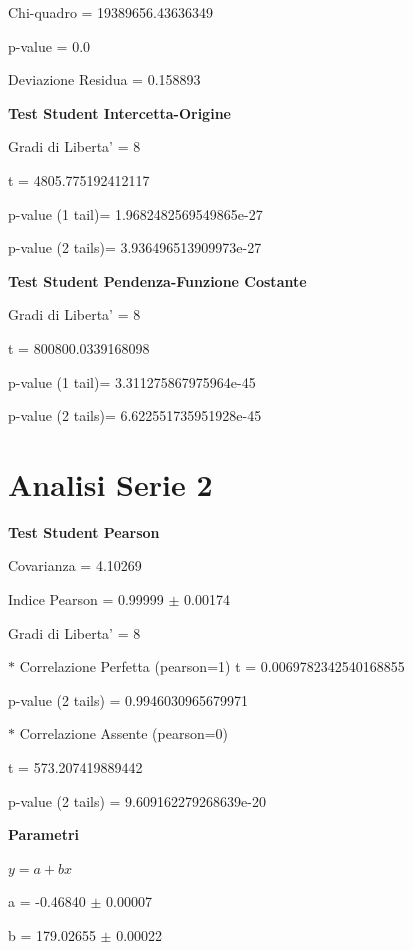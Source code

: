 \documentclass{article}
\begin{document}
Chi-quadro = 19389656.43636349

p-value = 0.0

Deviazione Residua = 0.158893

\textbf{Test Student Intercetta-Origine}

Gradi di Liberta' = 8

t = 4805.775192412117

p-value (1 tail)= 1.9682482569549865e-27

p-value (2 tails)= 3.936496513909973e-27

\textbf{Test Student Pendenza-Funzione Costante}

Gradi di Liberta' = 8

t = 800800.0339168098

p-value (1 tail)= 3.311275867975964e-45

p-value (2 tails)= 6.622551735951928e-45

\section*{Analisi Serie 2}

\textbf{Test Student Pearson}

Covarianza = 4.10269

Indice Pearson = 0.99999 $\pm$ 0.00174

Gradi di Liberta' = 8

$\ast$ Correlazione Perfetta (pearson=1)
t = 0.0069782342540168855

p-value (2 tails) = 0.9946030965679971

$\ast$ Correlazione Assente (pearson=0)

t = 573.207419889442

p-value (2 tails) = 9.609162279268639e-20

\textbf{Parametri}

$y = a + bx$

a = -0.46840 $\pm$ 0.00007

b = 179.02655 $\pm$ 0.00022
\end{document}
